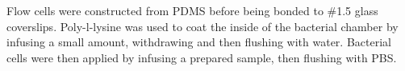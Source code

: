 \documentclass[../main.tex]{subfiles}
\begin{document}
Flow cells were constructed from PDMS before being bonded to \#1.5 glass coverslips. Poly-l-lysine was used to coat the inside of the bacterial chamber by infusing a small amount, withdrawing and then flushing with water. Bacterial cells were then applied by infusing a prepared sample, then flushing with PBS.
\end{document}
